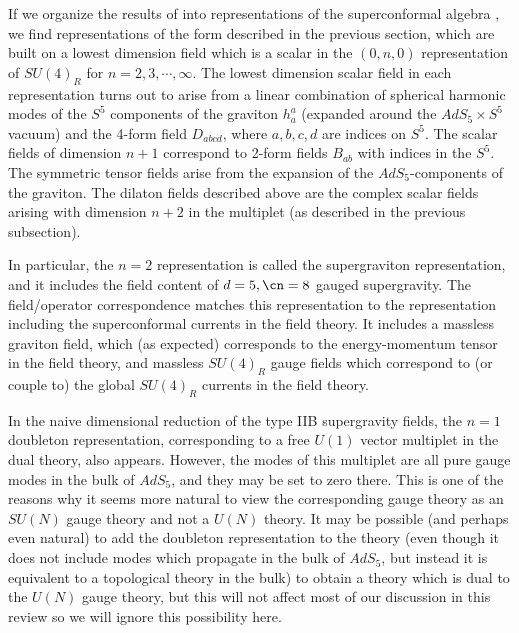 If we organize the results of \cite{Kim:1985ez} into representations
of the superconformal algebra \cite{Gunaydin:1985fk}, 
we find representations of the form
described in the previous section, which are built on a lowest
dimension field which is a scalar in the $(0,n,0)$ representation of
$SU(4)_R$ for $n=2,3,\cdots,\infty$. The lowest dimension scalar field
in each representation
turns out to arise from a linear combination of spherical harmonic
modes of the $S^5$ components of the graviton $h^a_a$ (expanded around
the $AdS_5\times S^5$ vacuum) and the 4-form field $D_{abcd}$, where
$a,b,c,d$ are indices on $S^5$. The scalar fields of dimension $n+1$
correspond to 2-form fields $B_{ab}$ with indices in the $S^5$.  The
symmetric tensor fields arise from the expansion of the
$AdS_5$-components of the graviton. The dilaton fields described above
are the complex scalar fields arising with dimension $n+2$ in the
multiplet (as described in the previous subsection).

In particular, the $n=2$ representation is called the supergraviton
representation, and it includes the field content of $d=5,\cn=8$
gauged supergravity. The field/operator correspondence matches this
representation to the representation including the superconformal
currents in the field theory. It includes a massless graviton field,
which (as expected) corresponds to the energy-momentum tensor in the
field theory, and massless $SU(4)_R$ gauge fields which correspond to
(or couple to) the global $SU(4)_R$ currents in the field theory.

In the naive dimensional reduction of the type IIB supergravity
fields, the $n=1$ doubleton representation, corresponding to a free
$U(1)$ vector multiplet in the dual theory, also appears. However, the
modes of this multiplet are all pure gauge modes in the bulk of
$AdS_5$, and they may be set to zero there. This is one of the reasons
why it seems more natural to view the corresponding gauge theory as an
$SU(N)$ gauge theory and not a $U(N)$ theory. It may be possible (and
perhaps even natural) to add the doubleton representation to the
theory (even though it does not include modes which propagate in the
bulk of $AdS_5$, but instead it is equivalent to a topological theory
in the bulk) to obtain a theory which is dual to the $U(N)$ gauge
theory, but this will not affect most of our discussion in this review
so we will ignore this possibility here.

